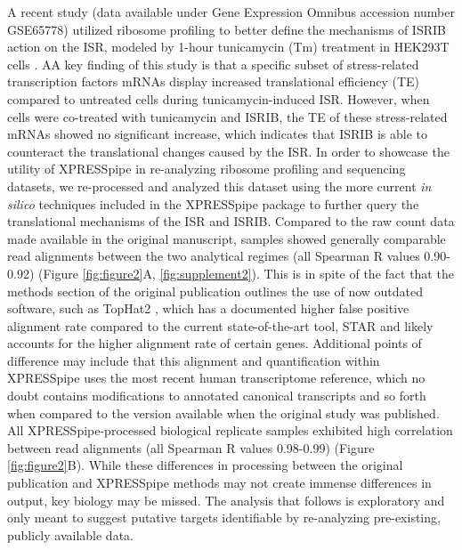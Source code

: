 \documentclass[10pt, oneside]{article}
\begin{document}
A recent study (data available under Gene Expression Omnibus accession number GSE65778) utilized ribosome profiling to better define the mechanisms of ISRIB action on the ISR, modeled by 1-hour tunicamycin (Tm) treatment in HEK293T cells \cite{isrib_riboseq}. AA key finding of this study is that a specific subset of stress-related transcription factors mRNAs display increased translational efficiency (TE) compared to untreated cells during tunicamycin-induced ISR. However, when cells were co-treated with tunicamycin and ISRIB, the TE of these stress-related mRNAs showed no significant increase, which indicates that ISRIB is able to counteract the translational changes caused by the ISR. In order to showcase the utility of XPRESSpipe in re-analyzing ribosome profiling and sequencing datasets, we re-processed and analyzed this dataset using the more current \textit{in silico} techniques included in the XPRESSpipe package to further query the translational mechanisms of the ISR and ISRIB. Compared to the raw count data made available in the original manuscript, samples showed generally comparable read alignments between the two analytical regimes (all Spearman R values 0.90-0.92) (Figure \ref{fig:figure2}A, \ref{fig:supplement2}). This is in spite of the fact that the methods section of the original publication outlines the use of now outdated software, such as TopHat2 \cite{tophat2}, which has a documented higher false positive alignment rate compared to the current state-of-the-art tool, STAR \cite{alignment_benchmark, star} and likely accounts for the higher alignment rate of certain genes. Additional points of difference may include that this alignment and quantification within XPRESSpipe uses the most recent human transcriptome reference, which no doubt contains modifications to annotated canonical transcripts and so forth when compared to the version available when the original study was published. All XPRESSpipe-processed biological replicate samples exhibited high correlation between read alignments (all Spearman R values 0.98-0.99) (Figure \ref{fig:figure2}B). While these differences in processing between the original publication and XPRESSpipe methods may not create immense differences in output, key biology may be missed. The analysis that follows is exploratory and only meant to suggest putative targets identifiable by re-analyzing pre-existing, publicly available data. \par
\end{document}
